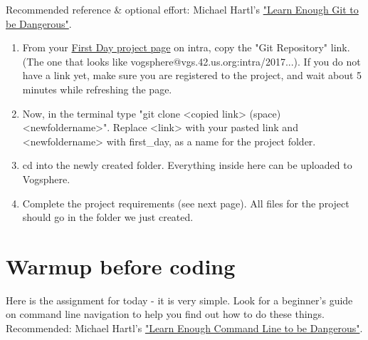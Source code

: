 \documentclass{42-en}
\begin{document}
Recommended reference \& optional effort: Michael Hartl's \href{https://www.learnenough.com/git-tutorial}{"Learn Enough Git to be Dangerous"}.

\begin{enumerate}

\item From your \href{https://projects.intra.42.fr/h2s-first-day/mine}{First Day project page} on intra, copy the "Git Repository" link. (The one that looks like vogsphere@vgs.42.us.org:intra/2017...). If you do not have a link yet, make sure you are registered to the project, and wait about 5 minutes while refreshing the page.

\item Now, in the terminal type "git clone <copied link> (space) <newfoldername>". Replace <link> with your pasted link and <newfoldername> with first\_day, as a name for the project folder.

\item cd into the newly created folder. Everything inside here can be uploaded to Vogsphere.

\item Complete the project requirements (see next page). All files for the project should go in the folder we just created.

\end{enumerate}



\chapter{Warmup before coding}

\makeheaderfiles

Here is the assignment for today - it is very simple. Look for a beginner's guide on command line navigation to help you find out how to do these things. Recommended: Michael Hartl's \href{https://www.learnenough.com/command-line-tutorial}{"Learn Enough Command Line to be Dangerous"}.
\end{document}
